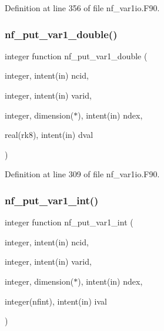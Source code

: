 Definition at line 356 of file nf\+\_\+var1io.\+F90.

\mbox{\label{nf__var1io_8F90_a5046421bf98dd86b2ec141c9fe6ef129}} 
\subsubsection{\texorpdfstring{nf\+\_\+put\+\_\+var1\+\_\+double()}{nf\_put\_var1\_double()}}
{\footnotesize\ttfamily integer function nf\+\_\+put\+\_\+var1\+\_\+double (\begin{DoxyParamCaption}\item[{integer, intent(in)}]{ncid,  }\item[{integer, intent(in)}]{varid,  }\item[{integer, dimension($\ast$), intent(in)}]{ndex,  }\item[{real(rk8), intent(in)}]{dval }\end{DoxyParamCaption})}



Definition at line 309 of file nf\+\_\+var1io.\+F90.

\mbox{\label{nf__var1io_8F90_a890965428535128437db4d62fc6c0a88}} 
\subsubsection{\texorpdfstring{nf\+\_\+put\+\_\+var1\+\_\+int()}{nf\_put\_var1\_int()}}
{\footnotesize\ttfamily integer function nf\+\_\+put\+\_\+var1\+\_\+int (\begin{DoxyParamCaption}\item[{integer, intent(in)}]{ncid,  }\item[{integer, intent(in)}]{varid,  }\item[{integer, dimension($\ast$), intent(in)}]{ndex,  }\item[{integer(nfint), intent(in)}]{ival }\end{DoxyParamCaption})}



